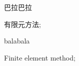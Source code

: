 ﻿%
\begin{cnabstract}


巴拉巴拉


\end{cnabstract}

\begin{cnkeywords}
有限元方法; 
\end{cnkeywords}


\newpage
\begin{enabstract}

balabala

\end{enabstract}

\begin{enkeywords}
  Finite element method;
\end{enkeywords} 

